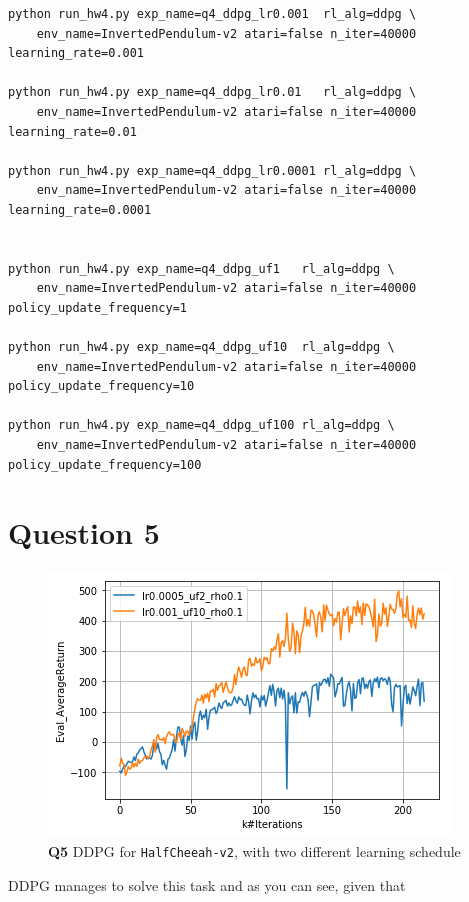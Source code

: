\documentclass[11pt]{article}
\begin{document}
\begin{verbatim}
python run_hw4.py exp_name=q4_ddpg_lr0.001  rl_alg=ddpg \
    env_name=InvertedPendulum-v2 atari=false n_iter=40000 learning_rate=0.001

python run_hw4.py exp_name=q4_ddpg_lr0.01   rl_alg=ddpg \
    env_name=InvertedPendulum-v2 atari=false n_iter=40000 learning_rate=0.01

python run_hw4.py exp_name=q4_ddpg_lr0.0001 rl_alg=ddpg \
    env_name=InvertedPendulum-v2 atari=false n_iter=40000 learning_rate=0.0001


python run_hw4.py exp_name=q4_ddpg_uf1   rl_alg=ddpg \
    env_name=InvertedPendulum-v2 atari=false n_iter=40000 policy_update_frequency=1

python run_hw4.py exp_name=q4_ddpg_uf10  rl_alg=ddpg \
    env_name=InvertedPendulum-v2 atari=false n_iter=40000 policy_update_frequency=10

python run_hw4.py exp_name=q4_ddpg_uf100 rl_alg=ddpg \
    env_name=InvertedPendulum-v2 atari=false n_iter=40000 policy_update_frequency=100
\end{verbatim}

\clearpage


\section{Question 5}
\label{sec:org7d240b3}

\begin{figure}[htbp]
\centering
\includegraphics[width=.9\linewidth]{./5.png}
\caption{\textbf{Q5} DDPG for \texttt{HalfCheeah-v2}, with two different learning schedule}
\end{figure}

DDPG manages to solve this task and as you can see, given that
\end{document}
